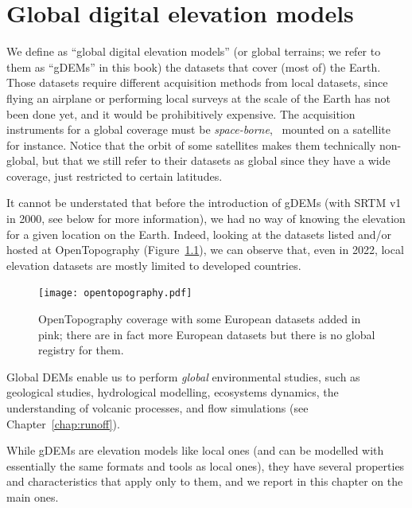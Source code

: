
\setchapterpreamble[u]{\margintoc}
\graphicspath{{gdem/figs/}}


\chapter{Global digital elevation models}%
\label{chap:gdem}

We define as ``global digital elevation models'' (or global terrains; we refer to them as ``gDEMs'' in this book) the datasets that cover (most of) the Earth.%
Those datasets require different acquisition methods from local datasets, since flying an airplane or performing local surveys at the scale of the Earth has not been done yet, and it would be prohibitively expensive.
The acquisition instruments for a global coverage must be \emph{space-borne}, \ie\ mounted on a satellite for instance.
Notice that the orbit of some satellites makes them technically non-global, but that we still refer to their datasets as global since they have a wide coverage, just restricted to certain latitudes.

%

It cannot be understated that before the introduction of gDEMs (with SRTM v1 in 2000, see below for more information), we had no way of knowing the elevation for a given location on the Earth.
Indeed, looking at the datasets listed and/or hosted at
OpenTopography (Figure~\ref{fig:dem_coverage}), we can observe that, even in 2022, local elevation datasets are mostly limited to developed countries.
\begin{figure}
  \centering
  \texttt{[image: opentopography.pdf]}
  \caption{OpenTopography coverage with some European datasets added in pink; there are in fact more European datasets but there is no global registry for them.}%
  \label{fig:dem_coverage}
\end{figure}

%

Global DEMs enable us to perform \emph{global} environmental studies, such as geological studies, hydrological modelling, ecosystems dynamics, the understanding of volcanic processes, and flow simulations (see Chapter~\ref{chap:runoff}).

%

While gDEMs are elevation models like local ones (and can be modelled with essentially the same formats and tools as local ones), they have several properties and characteristics that apply only to them, and we report in this chapter on the main ones.

